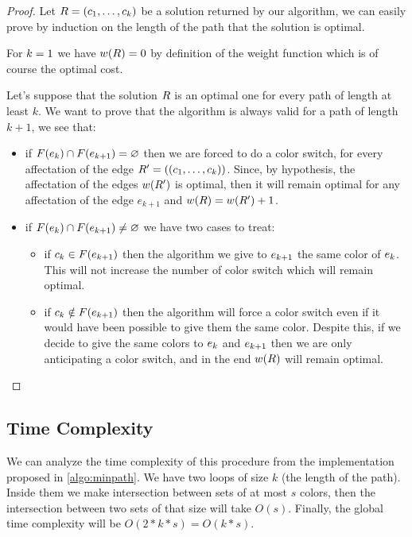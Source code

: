 \begin{proof}
  Let $R = (c_1,\ldots,c_{k})$ be a solution returned by our algorithm, we can easily prove by induction on the length of the path that the solution is optimal.

  For $k = 1$ we have $w(R) = 0$ by definition of the weight function which is of course the optimal cost.

  Let's suppose that the solution $R$ is an optimal one for every path of length at least $k$. We want to prove that the algorithm is always valid for a path of length $k+1$, we see that:

  \begin{itemize}
    \item if $F(e_k) \cap F(e_{k+1}) = \varnothing$ then we are forced to do a color switch, for every affectation of the edge $R' = ((c_1,\ldots,c_{k}))$. Since, by hypothesis, the affectation of the edges $w(R')$ is optimal, then it will remain optimal for any affectation of the edge $e_{k+1}$ and $w(R) = w(R') + 1$.
    \item if $F(e_k) \cap F(e_{k+1}) \neq \varnothing$ we have two cases to treat:
          \begin{itemize}
            \item if $c_k \in F(e_{k+1})$ then the algorithm we give to $e_{k+1}$ the same color of $e_{k}$. This will not increase the number of color switch which will remain optimal.
            \item if $c_k \notin F(e_{k+1})$ then the algorithm will force a color switch even if it would have been possible to give them the same color. Despite this, if we decide to give the same colors to $e_k$ and $e_{k+1}$ then we are only anticipating a color switch, and in the end $w(R)$ will remain optimal.
          \end{itemize}
  \end{itemize}
\end{proof}

\subsection{Time Complexity}

We can analyze the time complexity of this procedure from the implementation proposed in \cref{algo:minpath}. We have two loops of size $k$ (the length of the path). Inside them we make intersection between sets of at most $s$ colors, then the intersection between two sets of that size will take $O(s)$. Finally, the global time complexity will be $O(2 * k * s) = O(k*s)$.

